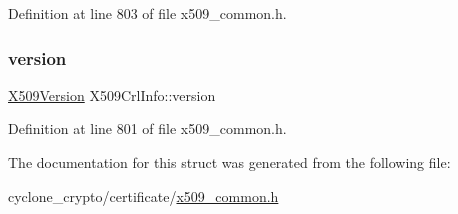 Definition at line 803 of file x509\+\_\+common.\+h.

\mbox{\label{structX509CrlInfo_a3eb1285124747734617d81bb7191f92f}} 
\subsubsection{\texorpdfstring{version}{version}}
{\footnotesize\ttfamily \hyperlink{certificate_2x509__common_8h_a42c631650a1a4fbe9d70d54d99dcac26}{X509\+Version} X509\+Crl\+Info\+::version}



Definition at line 801 of file x509\+\_\+common.\+h.



The documentation for this struct was generated from the following file\+:\begin{DoxyCompactItemize}
\item 
cyclone\+\_\+crypto/certificate/\hyperlink{certificate_2x509__common_8h}{x509\+\_\+common.\+h}\end{DoxyCompactItemize}
